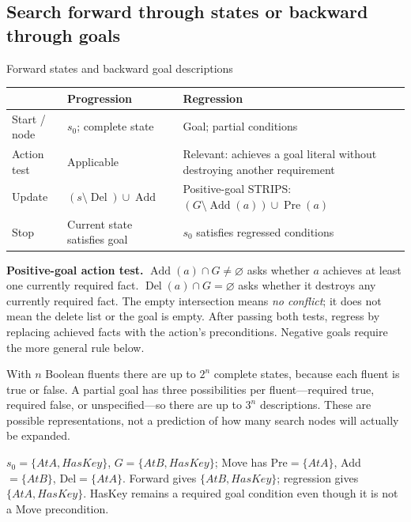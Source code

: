 \documentclass[10pt,a4paper]{article}
\newcommand{\Pre}{\operatorname{Pre}}
\newcommand{\Add}{\operatorname{Add}}
\newcommand{\Del}{\operatorname{Del}}
\begin{document}
\subsection{Search forward through states or backward through goals}
\begin{card}{Forward states and backward goal descriptions}
\small
\par\smallskip
\begin{tabularx}{\linewidth}{@{}P{2.3cm}Y Y@{}}
\toprule & Progression & Regression \\\midrule
Start / node & $s_0$; complete state & Goal; partial conditions \\
Action test & Applicable & Relevant: achieves a goal literal without destroying another requirement \\
Update & $(s\setminus\Del)\cup\Add$ & Positive-goal STRIPS: $(G\setminus\Add(a))\cup\Pre(a)$ \\
Stop & Current state satisfies goal & $s_0$ satisfies regressed conditions \\\bottomrule
\end{tabularx}\par\smallskip
\textbf{Positive-goal action test.} $\Add(a)\cap G\ne\varnothing$ asks whether $a$ achieves at least one currently required fact. $\Del(a)\cap G=\varnothing$ asks whether it destroys any currently required fact. The empty intersection means \emph{no conflict}; it does not mean the delete list or the goal is empty. After passing both tests, regress by replacing achieved facts with the action's preconditions. Negative goals require the more general rule below.

With $n$ Boolean fluents there are up to $2^n$ complete states, because each fluent is true or false. A partial goal has three possibilities per fluent---required true, required false, or unspecified---so there are up to $3^n$ descriptions. These are possible representations, not a prediction of how many search nodes will actually be expanded.
\end{card}

\begin{idea}
$s_0=\{AtA,HasKey\}$, $G=\{AtB,HasKey\}$; Move has Pre$=\{AtA\}$, Add$=\{AtB\}$, Del$=\{AtA\}$.
Forward gives $\{AtB,HasKey\}$; regression gives $\{AtA,HasKey\}$. HasKey remains a required goal condition even though it is not a Move precondition.
\end{idea}
\end{document}
